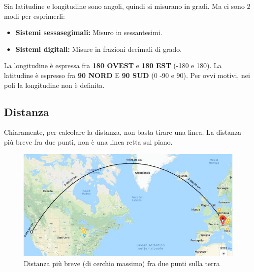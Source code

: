 \documentclass[a4paper,12pt]{article}
\begin{document}
Sia latitudine e longitudine sono angoli, quindi si misurano in gradi. Ma ci sono 2 modi per esprimerli:
\begin{itemize}
\item \textbf{Sistemi sessasegimali:} Misuro in sessantesimi.
\item \textbf{Sistemi digitali:} Misure in frazioni decimali di grado.
\end{itemize}

La longitudine è espressa fra \textbf{180 OVEST} e \textbf{180 EST} (-180 e 180). La latitudine è espresso fra \textbf{90 NORD} E \textbf{90 SUD} (0 -90 e 90). Per ovvi motivi, nei poli la longitudine non è definita.\\

\subsection{Distanza}
Chiaramente, per calcolare la distanza, non basta tirare una linea. La distanza più breve fra due punti, non è una linea retta sul piano.


\begin{figure}[H]
	\centering
	\includegraphics[width=.75\linewidth]{Immagini/CMax.png}
	\caption{Distanza più breve (di cerchio massimo) fra due punti sulla terra}
\end{figure}
\end{document}

